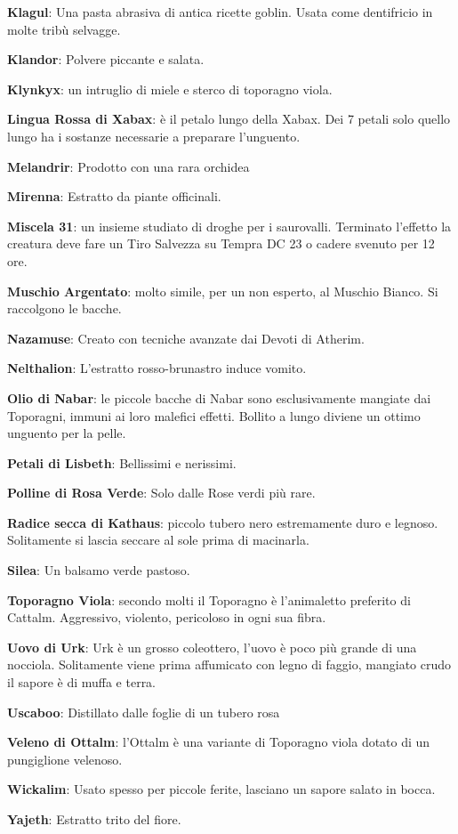 \begin{multicols}{2}
\textbf{Klagul}: Una pasta abrasiva di antica ricette goblin. Usata come dentifricio in molte tribù selvagge.

\textbf{Klandor}: Polvere piccante e salata.

\textbf{Klynkyx}: un intruglio di miele e sterco di toporagno viola.

\textbf{Lingua Rossa di Xabax}: è il petalo lungo della Xabax. Dei 7 petali solo quello lungo ha i sostanze necessarie a preparare l'unguento.

\textbf{Melandrir}: Prodotto con una rara orchidea

\textbf{Mirenna}: Estratto da piante officinali.

\textbf{Miscela 31}: un insieme studiato di droghe per i saurovalli. Terminato l'effetto la creatura deve fare un Tiro Salvezza su Tempra DC 23 o cadere svenuto per 12 ore.

\textbf{Muschio Argentato}: molto simile, per un non esperto, al Muschio Bianco. Si
 raccolgono le bacche.
 
\textbf{Nazamuse}: Creato con tecniche avanzate dai Devoti di Atherim.

\textbf{Nelthalion}: L'estratto rosso-brunastro induce vomito.

\textbf{Olio di Nabar}: le piccole bacche di Nabar sono esclusivamente mangiate dai Toporagni, immuni ai loro malefici effetti. Bollito a lungo diviene un ottimo unguento per la pelle.

\textbf{Petali di Lisbeth}: Bellissimi e nerissimi.

\textbf{Polline di Rosa Verde}: Solo dalle Rose verdi più rare.

\textbf{Radice secca di Kathaus}: piccolo tubero nero estremamente duro e legnoso. Solitamente si lascia seccare al sole prima di macinarla.


\textbf{Silea}: Un balsamo verde pastoso.

\textbf{Toporagno Viola}: secondo molti il Toporagno è l'animaletto preferito di Cattalm. Aggressivo, violento, pericoloso in ogni sua fibra.

\textbf{Uovo di Urk}: Urk è un grosso coleottero, l'uovo è poco più grande di una nocciola. Solitamente viene prima affumicato con legno di faggio, mangiato crudo il sapore è di muffa e terra.

\textbf{Uscaboo}: Distillato dalle foglie di un tubero rosa

\textbf{Veleno di Ottalm}: l'Ottalm è una variante di Toporagno viola dotato di un pungiglione velenoso.

\textbf{Wickalim}: Usato spesso per piccole ferite, lasciano un sapore salato in bocca.

\textbf{Yajeth}: Estratto trito del fiore.


\end{multicols}

